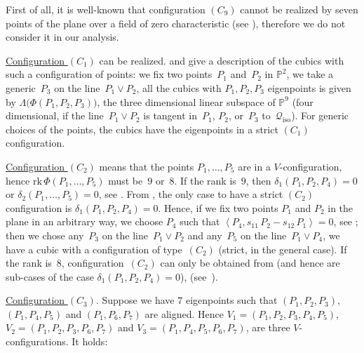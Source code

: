 \documentclass{amsart}
\theoremstyle{plain}
\theoremstyle{definition}
\newcommand{\p}{\mathbb{P}}
\newcommand{\iso}{\mathcal{Q}_{\mathrm{iso}}}
\newcommand{\scl}[2]{\left\langle {#1}, {#2} \right\rangle}
\newcommand{\rk}{\ensuremath{\mathrm{rk}}}
\begin{document}
First of all, it is well-known that configuration $(C_9)$ cannot be realized
by seven points of the plane over a field of zero
characteristic (see \cite{Whitney1935}), therefore we do not consider
it in our analysis.

\underline{Configuration $(C_1)$} can be realized.  and 
give a description of the cubics with such a configuration of points:
we fix two points~$P_1$ and~$P_2$ in $\p^2$, we take a generic~$P_3$
on the line~$P_1 \vee P_2$, all the cubics with
$P_1, P_2, P_3$ eigenpoints is given by $\Lambda \bigl( \Phi(P_1, P_2, P_3) \bigr)$, the three
dimensional linear subspace of $\p^9$ (four dimensional, if the
line~$P_1 \vee P_2$ is tangent in~$P_1$, $P_2$, or~$P_3$ to~$\iso$). For generic choices of the points, the cubics have the eigenpoints in a strict 
$(C_1)$ configuration.

\underline{Configuration $(C_2)$} means that the points
$P_1, \dots, P_5$ are in a
$V$-configuration, hence $\rk \, \Phi(P_1, \dotsc, P_5)$
must be~$9$ or~$8$. If the rank is~$9$, then $\delta_1(P_1, P_2, P_4) = 0$
or $\delta_2(P_1, \dotsc, P_5) = 0$, see .
From , the only case
to have a strict $(C_2)$ configuration 
is $\delta_1(P_1, P_2, P_4) = 0$. Hence, if we fix two points $P_1$ and $P_2$
in the plane in an arbitrary way, we choose $P_4$ such that
$\scl{P_4}{s_{11}\, P_2 - s_{12} \, P_1}=0$, see ; then we chose any~$P_3$
on the line~$P_1 \vee P_2$ and any~$P_5$ on the line~$P_1 \vee P_4$, we have a cubic with a configuration of type~$(C_2)$ (strict, in the general case). If the rank is~$8$, configuration~$(C_2)$ can only be obtained from  (and hence are sub-cases of the case $\delta_1(P_1, P_2, P_4)=0$), (see~).

\underline{Configuration $(C_3)$}. Suppose we have $7$ eigenpoints such that
$(P_1, P_2, P_3)$, $(P_1, P_4, P_5)$ and $(P_1, P_6, P_7)$ are
aligned. Hence
$V_1 = (P_1, P_2, P_3, P_4, P_5)$, $V_2 = (P_1, P_2, P_3, P_6, P_7)$ and
$V_3 = (P_1, P_4, P_5, P_6, P_7)$, are three $V$-configurations. It holds:
\end{document}
